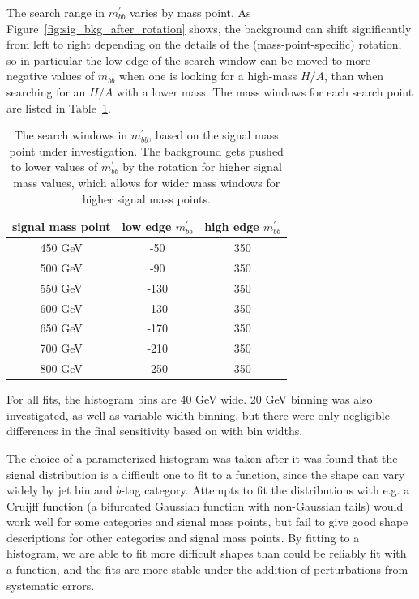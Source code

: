The search range in $m^{'}_{bb}$ varies by mass point.  As Figure~\ref{fig:sig_bkg_after_rotation}
shows, the background can shift significantly from left to right depending on the details
of the (mass-point-specific) rotation, so in particular the low edge of the search window
can be moved to more negative values of $m^{'}_{bb}$  when one is looking for a high-mass $H/A$,
than when searching for an $H/A$ with a lower mass.  The mass windows for each search
point are listed in Table~\ref{tab:mass_windows}.

\begin{table}
    \caption{The search windows in $m^{'}_{bb}$, based on the signal mass point 
    under investigation.  The background gets pushed to lower values of $m^{'}_{bb}$ 
    by the rotation for higher signal mass values, which allows for wider mass 
    windows for higher signal mass points.  \label{tab:mass_windows}}
    \begin{tabular}{ c c c } \hline \hline 
    signal mass point & low edge $m^{'}_{bb}$  &  high edge $m^{'}_{bb}$ \\ \hline
    450 GeV & -50 & 350 \\
    500 GeV & -90 & 350 \\ 
    550 GeV & -130 & 350 \\
    600 GeV & -130 & 350 \\
    650 GeV & -170 & 350 \\
    700 GeV & -210 & 350 \\
    800 GeV & -250 & 350 \\ \hline
    \end{tabular}
\end{table}

For all fits, the histogram bins are 40 GeV wide.  20 GeV binning was also investigated,
as well as variable-width binning, but there were only negligible differences in the
final sensitivity based on with bin widths.


The choice of a parameterized histogram was taken after it was found that 
the signal distribution is a difficult one to fit to a function, since the shape can vary
widely by jet bin and $b$-tag category.  Attempts to fit the distributions with e.g. a 
Cruijff function (a bifurcated Gaussian function with non-Gaussian tails) would work
well for some categories and signal mass points, but fail to give good shape descriptions
for other categories and signal mass points.  By fitting to a histogram, we are able
to fit more difficult shapes than could be reliably fit with a function, and the fits are
more stable under the addition of perturbations from systematic errors.


